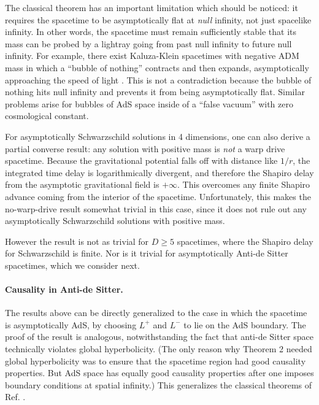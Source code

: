 \documentclass{article}
\begin{document}
The classical theorem \cite{SPW} has an important limitation which should be noticed: it requires the spacetime to be asymptotically flat at \emph{null} infinity, not just spacelike infinity.  In other words, the spacetime must remain sufficiently stable that its mass can be probed by a lightray going from past null infinity to future null infinity.  For example, there exist Kaluza-Klein spacetimes with negative ADM mass in which a ``bubble of nothing'' contracts and then expands, asymptotically approaching the speed of light \cite{witten82}.  This is not a contradiction because the bubble of nothing hits null infinity and prevents it from being asymptotically flat.  Similar problems arise for bubbles of AdS space inside of a ``false vacuum'' with zero cosmological constant.

For asymptotically Schwarzschild solutions in 4 dimensions, one can also derive a partial converse result: any solution with positive mass is \emph{not} a warp drive spacetime.  Because the gravitational potential falls off with distance like $1/r$, the integrated time delay is logarithmically divergent, and therefore the Shapiro delay from the asymptotic gravitational field is $+\infty$.  This overcomes any finite Shapiro advance coming from the interior of the spacetime.   Unfortunately, this makes the no-warp-drive result somewhat trivial in this case, since it does not rule out any asymptotically Schwarzschild solutions with positive mass.

However the result is not as trivial for $D \ge 5$ spacetimes, where the Shapiro delay for Schwarzschild is finite.  Nor is it trivial for asymptotically Anti-de Sitter spacetimes, which we consider next.

\paragraph{Causality in Anti-de Sitter.}  The results above can be directly generalized to the case in which the spacetime is asymptotically AdS, by choosing $L^+$ and $L^-$ to lie on the AdS boundary.  The proof of the result is analogous, notwithstanding the fact that anti-de Sitter space technically violates global hyperbolicity.  (The only reason why Theorem 2 needed global hyperbolicity was to ensure that the spacetime region had good causality properties.  But AdS space has equally good causality properties after one imposes boundary conditions at spatial infinity.)  This generalizes the classical theorems of Ref. \cite{woolgar94, GW00}.
\end{document}

